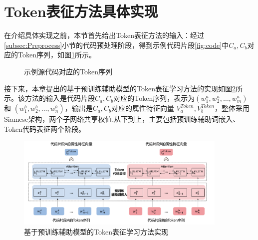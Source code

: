 \section{Token表征方法具体实现}
\label{sec:achieve}
在介绍具体实现之前，本节首先给出Token表征方法的输入：经过\ref{subsec:Preprocess}小节的代码预处理阶段，得到示例代码片段\ref{fig:code}中$C_{a},C_{b}$对应的Token序列，如图\ref{fig:tokencode}所示。
\begin{figure}[H] 
  \centering  %
  \caption{示例源代码对应的Token序列}    %
  \label{fig:tokencode}    %
\end{figure}

接下来，本章提出的基于预训练辅助模型的Token表征学习方法的实现如图\ref{fig:token}所示。该方法的输入是代码片段$C_{a},C_{b}$对应的Token序列，表示为$\left( w_{1}^{a},w_{2}^{a},\ldots,w_{m}^{a}\right)$ 和 $\left( w_{1}^{b},w_{2}^{b},\ldots,w_{n}^{b} \right)$，输出是$C_{a},C_{b}$对应的属性特征向量 $V_{a}^{Token},V_{b}^{Token}$，整体采用Siamese架构，两个子网络共享权值,从下到上，主要包括预训练辅助词嵌入、Token代码表征两个阶段。

\begin{figure}[H]
  \centering
  \includegraphics[width=0.9\textwidth]{figures/token}
  \caption{基于预训练辅助模型的Token表征学习方法实现}\label{fig:token}
\end{figure}

